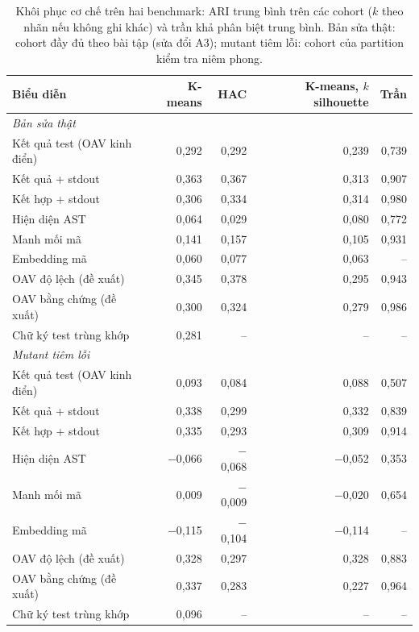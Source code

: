 \documentclass[a4paper,preprint,12pt,authoryear]{elsarticle}
\begin{document}
\begin{table}[t]
\centering
\caption{Khôi phục cơ chế trên hai benchmark: ARI trung bình trên các cohort ($k$ theo nhãn nếu không ghi khác) và trần khả phân biệt trung bình. Bản sửa thật: cohort đầy đủ theo bài tập (sửa đổi A3); mutant tiêm lỗi: cohort của partition kiểm tra niêm phong.}\label{tab:ari}
\small
\begin{tabular}{lrrrr}
\toprule
Biểu diễn & K-means & HAC & K-means, $k$ silhouette & Trần \\
\midrule
\multicolumn{5}{l}{\emph{Bản sửa thật}} \\
Kết quả test (OAV kinh điển) & 0,292 & 0,292 & 0,239 & 0,739 \\
Kết quả + stdout & 0,363 & 0,367 & 0,313 & 0,907 \\
Kết hợp + stdout & 0,306 & 0,334 & 0,314 & 0,980 \\
Hiện diện AST & 0,064 & 0,029 & 0,080 & 0,772 \\
Manh mối mã & 0,141 & 0,157 & 0,105 & 0,931 \\
Embedding mã & 0,060 & 0,077 & 0,063 & -- \\
OAV độ lệch (đề xuất) & 0,345 & 0,378 & 0,295 & 0,943 \\
OAV bằng chứng (đề xuất) & 0,300 & 0,324 & 0,279 & 0,986 \\
Chữ ký test trùng khớp & 0,281 & -- & -- & -- \\
\midrule
\multicolumn{5}{l}{\emph{Mutant tiêm lỗi}} \\
Kết quả test (OAV kinh điển) & 0,093 & 0,084 & 0,088 & 0,507 \\
Kết quả + stdout & 0,338 & 0,299 & 0,332 & 0,839 \\
Kết hợp + stdout & 0,335 & 0,293 & 0,309 & 0,914 \\
Hiện diện AST & $-$0,066 & $-$0,068 & $-$0,052 & 0,353 \\
Manh mối mã & 0,009 & $-$0,009 & $-$0,020 & 0,654 \\
Embedding mã & $-$0,115 & $-$0,104 & $-$0,114 & -- \\
OAV độ lệch (đề xuất) & 0,328 & 0,297 & 0,328 & 0,883 \\
OAV bằng chứng (đề xuất) & 0,337 & 0,283 & 0,227 & 0,964 \\
Chữ ký test trùng khớp & 0,096 & -- & -- & -- \\
\bottomrule
\end{tabular}
\end{table}
\end{document}
